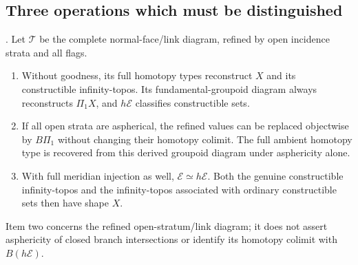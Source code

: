 \subsection{Three operations which must be distinguished}

\begin{theorem}\label{P1c1}
.
Let $\mathcal T$ be the complete normal-face/link diagram,
refined by open incidence strata and all flags.
\begin{enumerate}
\item Without goodness, its full homotopy types reconstruct $X$
      and its constructible infinity-topos. Its fundamental-groupoid
      diagram always reconstructs $\Pi_1X$, and $h\mathcal E$
      classifies constructible sets.
\item If all open strata are aspherical, the refined values can
      be replaced objectwise by $B\Pi_1$ without changing their
      homotopy colimit. The full ambient homotopy type is recovered
      from this derived groupoid diagram under asphericity alone.
\item With full meridian injection as well,
      $\mathcal E\simeq h\mathcal E$. Both the genuine constructible
      infinity-topos and the infinity-topos associated with
      ordinary constructible sets then have shape $X$.
\end{enumerate}
Item two concerns the refined open-stratum/link diagram;
it does not assert asphericity of closed branch intersections
or identify its homotopy colimit with $B(h\mathcal E)$.
\end{theorem}
